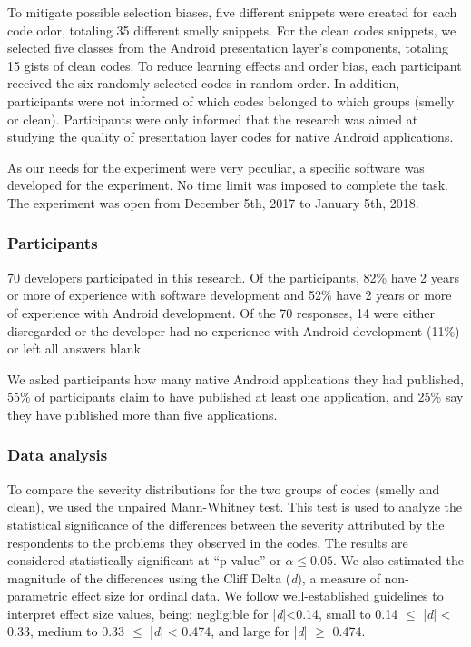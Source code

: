 To mitigate possible selection biases, five different snippets were created for each code odor, totaling 35 different smelly snippets. For the clean codes snippets, we selected five classes from the Android presentation layer's components, totaling 15 gists of clean codes. 
To reduce learning effects and order bias, each participant received the six randomly selected codes in random order. In addition, participants were not informed of which codes belonged to which groups (smelly or clean). Participants were only informed that the research was aimed at studying the quality of presentation layer codes for native Android applications. 

As our needs for the experiment were very peculiar, a specific software was developed for the experiment. No time limit was imposed to complete the task.
The experiment was open from December 5th, 2017 to January 5th, 2018.


\subsubsection{Participants}
\label{etapa-3-participantes-analise}

70 developers participated in this research. Of the participants, 82\% have 2 years or more of experience with software development and 52\% have 2 years or more of experience with Android development. Of the 70 responses, 14 were either disregarded or the developer had no experience with Android development (11\%) or left all answers blank.

We asked participants how many native Android applications they had published, 55\% of participants claim to have published at least one application, and 25\% say they have published more than five applications.


\subsubsection{Data analysis}

To compare the severity distributions for the two groups of codes (smelly and clean), we used the unpaired Mann-Whitney\cite{Conover:99} test. This test is used to analyze the statistical significance of the differences between the severity attributed by the respondents to the problems they observed in the codes. The results are considered statistically significant at ``p value'' or $\alpha \leq  0.05$. We also estimated the magnitude of the differences using the Cliff Delta (\textit{d}), a measure of non-parametric effect size \cite{EffectSize:05} for ordinal data. We follow well-established guidelines \cite {EffectSize:05} to interpret effect size values, being: negligible for |\textit{d}|<0.14, small to 0.14 $\leq$ |\textit{d}| < 0.33, medium to 0.33 $\leq$ |\textit{d}| < 0.474, and large for |\textit{d}| $\geq$ 0.474. 

